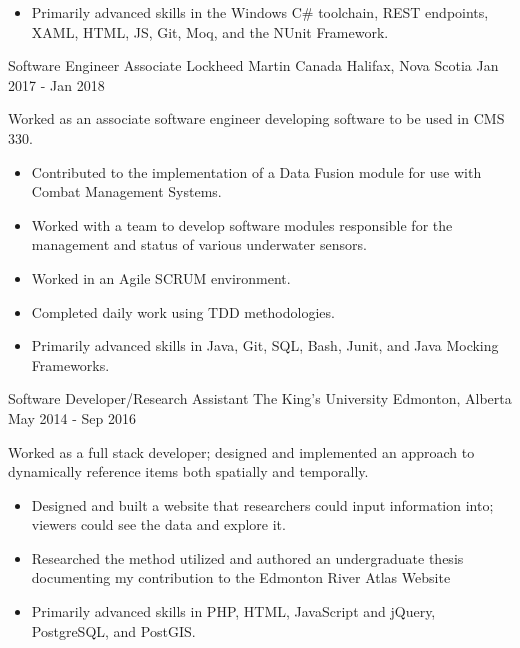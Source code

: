 \begin{cventries}
{\begin{itemize}
                \item Primarily advanced skills in the Windows C\# toolchain, REST endpoints, XAML, HTML, JS, Git, Moq, and the NUnit Framework.
            \end{itemize}
        }
    \cventry
        {Software Engineer Associate}
        {Lockheed Martin Canada}
        {Halifax, Nova Scotia}
        {Jan 2017 - Jan 2018}
        {
            Worked as an associate software engineer developing software to be used in CMS 330.
            \begin{itemize}
                \item Contributed to the implementation of a Data Fusion module for use with Combat Management Systems.
                \item Worked with a team to develop software modules responsible for the management and status of various underwater sensors.
                \item Worked in an Agile SCRUM environment.
                \item Completed daily work using TDD methodologies.
                \item Primarily advanced skills in Java, Git, SQL, Bash, Junit, and Java Mocking Frameworks.
            \end{itemize}
        }
    \cventry
        {Software Developer/Research Assistant}
        {The King's University}
        {Edmonton, Alberta}
        {May 2014 - Sep 2016}
        {
            Worked as a full stack developer; designed and implemented an approach to dynamically reference items both spatially and temporally.
            \begin{itemize}
                \item Designed and built a website that researchers could input information into; viewers could see the data and explore it.
                \item Researched the method utilized and authored an undergraduate thesis documenting my contribution to the Edmonton River Atlas
                Website
                \item Primarily advanced skills in PHP, HTML, JavaScript and jQuery, PostgreSQL, and PostGIS.
            \end{itemize}
        }

\end{cventries}